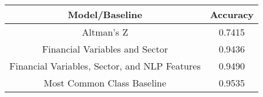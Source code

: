 \footnotesize
\begin{tabular}{cc}
\toprule
Model/Baseline & Accuracy \\
\midrule
Altman's Z & 0.7415 \\
Financial Variables and Sector & 0.9436 \\
Financial Variables, Sector, and NLP Features & 0.9490 \\
Most Common Class Baseline & 0.9535 \\
\bottomrule
\end{tabular}

\normalsize